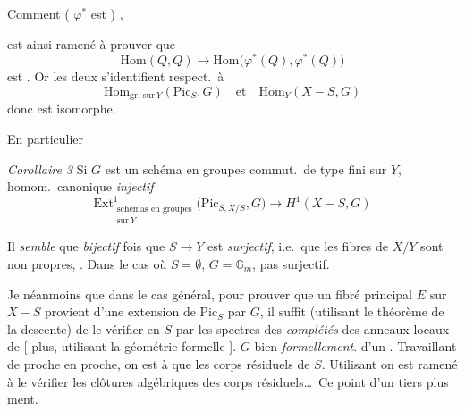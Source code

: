 \documentclass[11pt,a4paper]{article}
\begin{document}
Comment (\ill{} $\varphi^{*}$ est \ill{}  \ill{}
\ill{}) \ill{} \ill{} \ill{}, \struck{\ill{}} \ill{}

est ainsi ramené à prouver que
\[
\mathrm{Hom}(Q, Q) \longrightarrow \mathrm{Hom}\bigl(\varphi^{*}(Q), \varphi^{*}(Q)\bigr)
\]
est . Or les deux s'identifient respect.\ à
\[
\mathrm{Hom}_{\text{gr.\ sur}\ Y}(\mathrm{Pic}_{S}, G) \quad\text{et}\quad \mathrm{Hom}_Y(X - S, G)
\]
donc est isomorphe.

En particulier

\emph{Corollaire 3} Si $G$ est un schéma en groupes commut.\ de type fini
sur $Y$, \ill{} \ill{} \ill{} homom.\ canonique \emph{injectif}
\[
\mathrm{Ext}^1_{\substack{\text{schémas en groupes}\\ \text{sur}\ Y}}\bigl(\mathrm{Pic}_{S, X/S}, G\bigr) \longrightarrow H^1(X - S, G)
\]

Il \emph{semble} que  \emph{bijectif} 
fois que $S \to Y$ est \emph{surjectif}, i.e.\ que les fibres de $X/Y$ sont
non propres, \ill{} \emph{\ill{}}. Dans le cas où $S = \emptyset$,
$G = \mathbb{G}_m$, \ill{} \ill{} \ill{} pas surjectif.

Je  néanmoins que dans le cas général, pour prouver que
un fibré principal $E$ sur $X - S$ provient d'une 
extension de $\mathrm{Pic}_S$ par $G$, il suffit (utilisant le théorème de
la descente) de le vérifier en  $S$ par les spectres
des \emph{complétés} des \ill{} anneaux locaux de \ill{} [\ill{} plus,
utilisant la géométrie formelle \struck{\ill{}} \ill{}]. $G$ \ill{} bien
\ill{} \ill{} \ill{} \ill{} \ill{} \ill{} \emph{formellement}. \ill{} \ill{}
\ill{} \ill{} \ill{} d'un \ill{} \ill{} \ill{}. Travaillant de proche en
proche, on est \ill{} à  que \ill{} \ill{} \ill{}
\add{\ill{}} les corps résiduels de $S$. Utilisant \ill{} \ill{} \ill{}
 on est ramené à le vérifier \ill{} \ill{} les
clôtures algébriques des corps résiduels\ldots\ Ce point \ill{} \ill{}
\ill{} \ill{} d'un tiers plus \ill{}ment.
\end{document}
